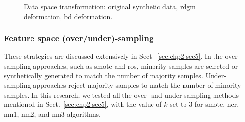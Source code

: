 \begin{figure}
  \hspace*{\fill}
  \hfill
  \hfill
  \hspace*{\fill}
  \caption[Data space over sampling algorithm]{Data space transformation: \protect{} original synthetic data, \protect{} \acs*{rdgm} deformation, \protect{} \acs*{bd} deformation.}
  \label{fig:DSOS}
\end{figure}

\subsubsection{Feature space (over/under)-sampling}
These strategies are discussed extensively in Sect.~\ref{sec:chp2-sec5}.
In the over-sampling approaches, such as \ac{smote} and \ac{ros}, minority samples are selected or synthetically generated to match the number of majority samples.
Under-sampling approaches reject majority samples to match the number of minority samples.
In this research, we tested all the over- and under-sampling methods mentioned in Sect.~\ref{sec:chp2-sec5}, with the value of $k$ set to 3 for \ac{smote}, \ac{ncr}, \ac{nm1}, \ac{nm2}, and \ac{nm3} algorithms.
